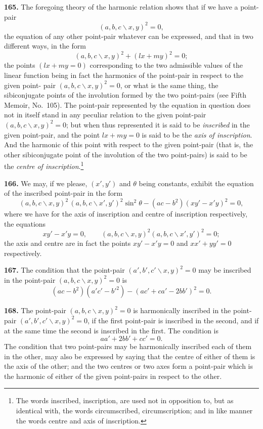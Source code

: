 \documentclass[11pt,a4paper]{article}
\begin{document}
\textbf{165.} The foregoing theory of the harmonic relation shows that if we have a
point-pair
\[
(a,b,c\!\backslash x,y)^2=0,
\]
the equation of any other point-pair whatever can be expressed, and that in two
different ways, in the form
\[
(a,b,c\!\backslash x,y)^2+(lx+my)^2=0;
\]
the points $(lx+my=0)$ corresponding to the two admissible values of the linear
function being in fact the harmonics of the point-pair in respect to the given point-
pair $(a,b,c\!\backslash x,y)^2=0$, or what is the same thing, the sibiconjugate points of the
involution formed by the two point-pairs (see Fifth Memoir, No.~105). The point-pair
represented by the equation in question does not in itself stand in any peculiar
relation to the given point-pair $(a,b,c\!\backslash x,y)^2=0$; but when thus represented it is said
to be \textit{inscribed} in the given point-pair, and the point $lx+my=0$ is said to be the
\textit{axis of inscription}. And the harmonic of this point with respect to the given point-pair
(that is, the other sibiconjugate point of the involution of the two point-pairs) is said
to be the \textit{centre of inscription}.\footnote{The words inscribed, inscription, are used not in opposition to, but as identical with, the words circumscribed, circumscription; and in like manner the words centre and axis of inscription.}

\textbf{166.} We may, if we please, $(x',y')$ and $\theta$ being constants, exhibit the equation
of the inscribed point-pair in the form
\[
(a,b,c\!\backslash x,y)^2\,(a,b,c\!\backslash x',y')^2\sin^2\theta-(ac-b^2)(xy'-x'y)^2=0,
\]
where we have for the axis of inscription and centre of inscription respectively, the
equations
\[
xy'-x'y=0,\qquad (a,b,c\!\backslash x,y)^2\!(a,b,c\!\backslash x',y')^2=0;
\]
the axis and centre are in fact the points $xy'-x'y=0$ and
$xx'+yy'=0$ respectively.

\textbf{167.} The condition that the point-pair $(a',b',c'\!\backslash x,y)^2=0$ may be inscribed in
the point-pair $(a,b,c\!\backslash x,y)^2=0$ is
\[
(ac-b^2)(a'c'-b'^2) - (ac'+ca'-2bb')^2 = 0.
\]

\textbf{168.} The point-pair $(a,b,c\!\backslash x,y)^2=0$ is harmonically inscribed in the point-
pair $(a',b',c'\!\backslash x,y)^2=0$, if the first point-pair is inscribed in the second, and if at the
same time the second is inscribed in the first. The condition is
\[
aa'+2bb'+cc'=0.
\]
The condition that two point-pairs may be harmonically inscribed each of them in
the other, may also be expressed by saying that the centre of either of them is the
axis of the other; and the two centres or two axes form a point-pair which is the
harmonic of either of the given point-pairs in respect to the other.
\end{document}
